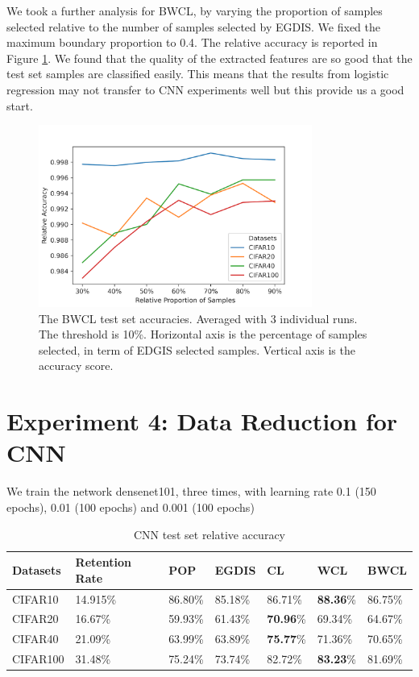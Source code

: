 We took a further analysis for BWCL, by varying the proportion of samples selected relative to the number of samples selected by EGDIS. We fixed the maximum boundary proportion to 0.4. The relative accuracy is reported in Figure \ref{Fig.logistic_subsets}. We found that the quality of the extracted features are so good that the test set samples are classified easily. This means that the results from logistic regression may not transfer to CNN experiments well but this provide us a good start.

\begin{figure}[H]
 \centering
 \includegraphics[width=0.8\textwidth]{src/bwcl_relative_size04.png}
 \caption{The BWCL test set accuracies. Averaged with 3 individual runs. The threshold is 10\%. Horizontal axis is the percentage of samples selected, in term of EDGIS selected samples. Vertical axis is the accuracy score.}
 \label{Fig.logistic_subsets}
 \end{figure}

\section{Experiment 4: Data Reduction for CNN}
\label{CNN}
We train the network densenet101, three times, with learning rate 0.1 (150 epochs), 0.01 (100 epochs) and 0.001 (100 epochs)

\begin{table}[H]
    \centering
    \begin{tabular}{|l|l|l|l|l|l|l|}
    \hline
        Datasets & Retention Rate  & POP & EGDIS & CL & WCL & BWCL \\ \hline
        CIFAR10 & 14.915\% & 86.80\% & 85.18\% & 86.71\% &\textbf{88.36}\% & 86.75\% \\ \hline
        CIFAR20 & 16.67\% & 59.93\% & 61.43\% & \textbf{70.96}\% & 69.34\% & 64.67\% \\ \hline
        CIFAR40 & 21.09\% & 63.99\% & 63.89\% & \textbf{75.77}\% & 71.36\% & 70.65\% \\ \hline
        CIFAR100 & 31.48\% & 75.24\% & 73.74\% & 82.72\% & \textbf{83.23}\% & 81.69\% \\ \hline
    \end{tabular}
    \caption{CNN test set relative accuracy}
    \label{132e3213}
\end{table}

